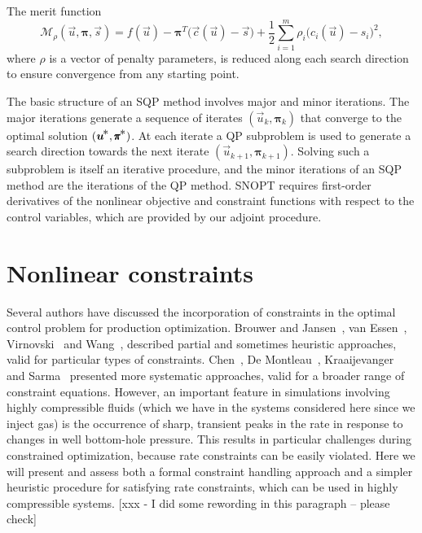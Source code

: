 \documentclass[twocolumn,numbook]{svjour3}          %
\def\u{{\vec u}}
\def\c{{\vec c}}
\def\s{{\vec s}}
\def\bpi{{\pmb{\pi}}}%
\def\half  {{\textstyle{\frac12}}}
\def\kp#1{_{k+#1}}
\def\Mscr{{\mathcal M}}
\def\nthinsp{\mskip -2   mu}
\def\bpistar{\bpi\superstar}
\def\superstar{^{\raise 0.5pt\hbox{$\nthinsp *$}}}
\def\T{^T\!}
\def\ustar{\u\superstar}
\def\SNOPT {{\small SNOPT}}
\begin{document}
The merit function 
\begin{equation}                              \label{eqn-def-merit}
        \Mscr_\rho(\u,\bpi,\s)
          = f(\u) - \bpi\T \bigl( \c(\u) - \s \bigr)
            + \half \sum_{i=1}^m \rho_i\big( c_i(\u) - s_i\big)^2,
\end{equation}
where $\rho$ is a vector of penalty parameters,
is reduced along each search
direction to ensure convergence from any starting point.

 The basic structure of an SQP method involves major and
minor iterations.  The major iterations generate a sequence of
iterates $(\u_k,\bpi_k)$ that converge to the optimal solution $(\ustar,\bpistar)$.
At each iterate a QP subproblem is used to generate a search direction
towards the next iterate $(\u\kp1,\bpi\kp1)$. Solving such a subproblem
is itself an iterative procedure, and the minor iterations of an
SQP method are the iterations of the QP method.
\SNOPT{} requires first-order derivatives of the nonlinear
objective and constraint functions with respect to the control variables, which
are provided by our adjoint procedure.



\section{Nonlinear constraints} \label{sec:constraints} 
Several authors have discussed the incorporation of constraints in the optimal
control problem for production optimization. Brouwer and 
Jansen~\cite{Brouwer:2004}, van Essen~\cite{VanEssen}, Virnovski~\cite{Virnovski} and
Wang~\cite{Wang:2009},
described partial and sometimes heuristic approaches, valid for
particular types of constraints. Chen~\cite{Chen:2010}, De Montleau~\cite{Montleau},
 Kraaijevanger~\cite{Kraaijevanger} and Sarma~\cite{Pallav:2006, Pallav:2008} 
presented more systematic approaches, valid for a broader range of constraint equations. However, an important feature in simulations involving highly compressible fluids (which we have in the systems considered here since we inject gas) is the occurrence of sharp, transient peaks in the rate in response to changes in well bottom-hole pressure. This results in
particular challenges during constrained optimization, because rate constraints can be easily violated. Here we will present and assess both a formal constraint handling approach and a simpler heuristic procedure for satisfying rate constraints, which can be used in highly compressible systems.
[xxx - I did some rewording in this paragraph -- please check]
\end{document}
